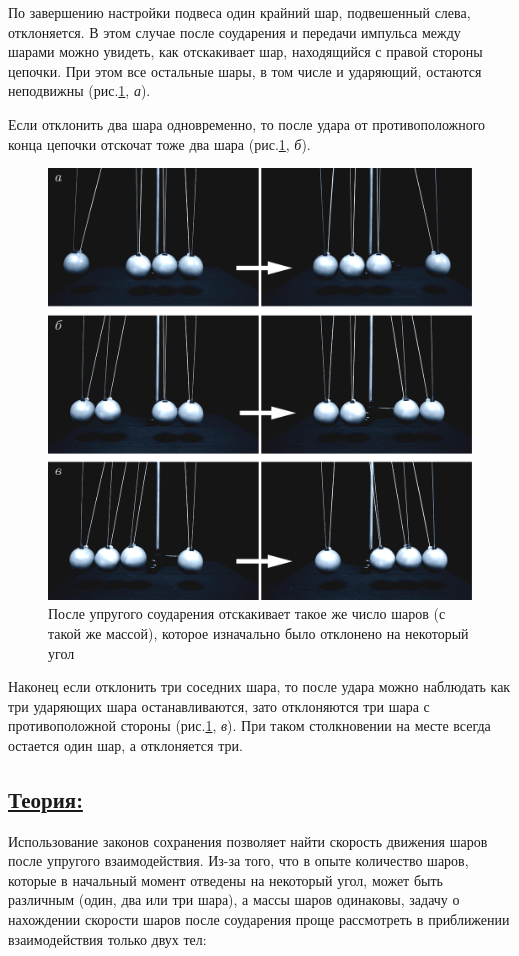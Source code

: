 \documentclass[14pt,a4paper,oneside]{extarticle}	%
\begin{document}
По завершению настройки подвеса один крайний шар, подвешенный слева, отклоняется.
В этом случае после соударения и передачи импульса между шарами можно увидеть, как отскакивает шар, находящийся с правой стороны цепочки.
При этом все остальные шары, в том числе и ударяющий, остаются неподвижны (рис.\ref{impact-3}, \textit{а}).

Если отклонить два шара одновременно, то после удара от противоположного конца цепочки отскочат тоже два шара (рис.\ref{impact-3}, \textit{б}).
\begin{figure}[H]
	\centering 	
	\includegraphics[width=0.9\linewidth]{impact-3.png}
	\caption{После упругого соударения отскакивает такое же число шаров (с такой же массой), которое изначально было отклонено на некоторый угол}\label{impact-3}
\end{figure}

Наконец если отклонить три соседних шара, то после удара можно наблюдать как три ударяющих шара останавливаются, зато отклоняются три шара с противоположной стороны (рис.\ref{impact-3}, \textit{в}).
При таком столкновении на месте всегда остается один шар, а отклоняется три. 

\newpage
\subsection*{\underline{Теория:}}

Использование законов сохранения позволяет найти скорость движения шаров после упругого взаимодействия.
Из-за того, что в опыте количество шаров, которые в начальный момент отведены на некоторый угол, может быть различным (один, два или три шара), а массы шаров одинаковы, задачу о нахождении скорости шаров после соударения проще рассмотреть в приближении взаимодействия только двух тел:
\end{document}
